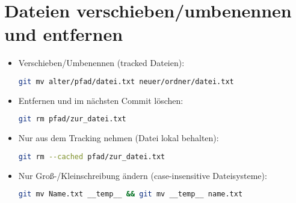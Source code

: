 \documentclass[a4paper,11pt]{article}
\begin{document}
	\section{Dateien verschieben/umbenennen und entfernen}
	\begin{itemize}
		\item Verschieben/Umbenennen (tracked Dateien):
		\begin{lstlisting}[language=bash]
			git mv alter/pfad/datei.txt neuer/ordner/datei.txt
		\end{lstlisting}
		\item Entfernen und im nächsten Commit löschen:
		\begin{lstlisting}[language=bash]
			git rm pfad/zur_datei.txt
		\end{lstlisting}
		\item Nur aus dem Tracking nehmen (Datei lokal behalten):
		\begin{lstlisting}[language=bash]
			git rm --cached pfad/zur_datei.txt
		\end{lstlisting}
		\item Nur Groß-/Kleinschreibung ändern (case-insensitive Dateisysteme):
		\begin{lstlisting}[language=bash]
			git mv Name.txt __temp__ && git mv __temp__ name.txt
		\end{lstlisting}
	\end{itemize}
	
\end{document}
